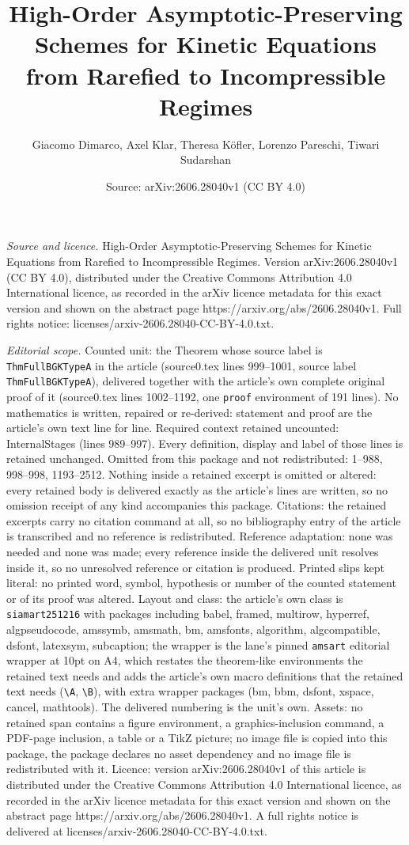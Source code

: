 \documentclass[10pt,a4paper]{amsart}
\title[High-Order Asymptotic-Preserving Schemes for Kinetic Equatio]{High-Order Asymptotic-Preserving Schemes for Kinetic Equations from Rarefied to Incompressible Regimes}
\author{Giacomo Dimarco, Axel Klar, Theresa K\"ofler, Lorenzo Pareschi, Tiwari Sudarshan}
\date{Source: arXiv:2606.28040v1 (CC BY 4.0)}
\begin{document}
\maketitle

\noindent\emph{Source and licence.} High-Order Asymptotic-Preserving Schemes for Kinetic Equations from Rarefied to Incompressible Regimes. Version arXiv:2606.28040v1 (CC BY 4.0), distributed under the Creative Commons Attribution 4.0 International licence, as recorded in the arXiv licence metadata for this exact version and shown on the abstract page https://arxiv.org/abs/2606.28040v1. Full rights notice: licenses/arxiv-2606.28040-CC-BY-4.0.txt.\par\smallskip

\noindent\textit{Editorial scope.} Counted unit: the Theorem whose source label is \texttt{ThmFullBGKTypeA} in the article (source0.tex lines 999--1001, source label \texttt{ThmFullBGKTypeA}), delivered together with the article's own complete original proof of it (source0.tex lines 1002--1192, one \texttt{proof} environment of 191 lines). No mathematics is written, repaired or re-derived: statement and proof are the article's own text line for line. Required context retained uncounted: InternalStages (lines 989--997). Every definition, display and label of those lines is retained unchanged. Omitted from this package and not redistributed: 1--988, 998--998, 1193--2512. Nothing inside a retained excerpt is omitted or altered: every retained body is delivered exactly as the article's lines are written, so no omission receipt of any kind accompanies this package. Citations: the retained excerpts carry no citation command at all, so no bibliography entry of the article is transcribed and no reference is redistributed. Reference adaptation: none was needed and none was made; every reference inside the delivered unit resolves inside it, so no unresolved reference or citation is produced. Printed slips kept literal: no printed word, symbol, hypothesis or number of the counted statement or of its proof was altered. Layout and class: the article's own class is \texttt{siamart251216} with packages including babel, framed, multirow, hyperref, algpseudocode, amssymb, amsmath, bm, amsfonts, algorithm, algcompatible, dsfont, latexsym, subcaption; the wrapper is the lane's pinned \texttt{amsart} editorial wrapper at 10pt on A4, which restates the theorem-like environments the retained text needs and adds the article's own macro definitions that the retained text needs (\texttt{\textbackslash A}, \texttt{\textbackslash B}), with extra wrapper packages (bm, bbm, dsfont, xspace, cancel, mathtools). The delivered numbering is the unit's own. Assets: no retained span contains a figure environment, a graphics-inclusion command, a PDF-page inclusion, a table or a TikZ picture; no image file is copied into this package, the package declares no asset dependency and no image file is redistributed with it. Licence: version arXiv:2606.28040v1 of this article is distributed under the Creative Commons Attribution 4.0 International licence, as recorded in the arXiv licence metadata for this exact version and shown on the abstract page https://arxiv.org/abs/2606.28040v1. A full rights notice is delivered at licenses/arxiv-2606.28040-CC-BY-4.0.txt. 
\end{document}

